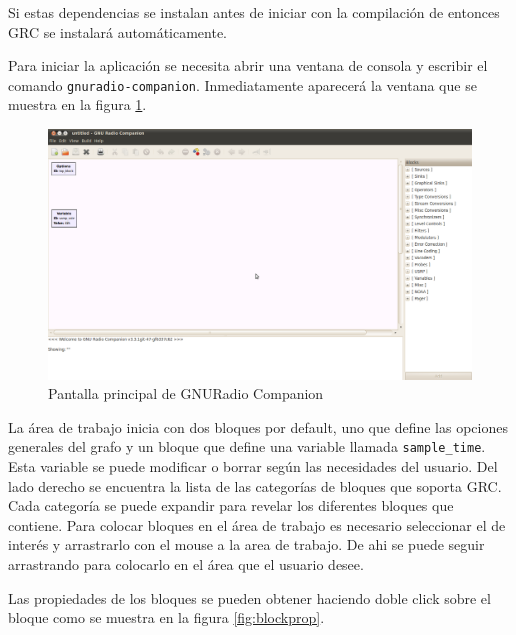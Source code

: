 Si estas dependencias se instalan antes de iniciar con la compilaci\'on de \gnuradio entonces GRC se
instalar\'a autom\'aticamente.

Para iniciar la aplicaci\'on se necesita abrir una ventana de consola y escribir el comando
\verb|gnuradio-companion|. Inmediatamente aparecer\'a la ventana que se muestra en la figura
\ref{fig:grc}.

\begin{figure}[tp]
  \centering
  \includegraphics[width=5.5in]{figs/grc1}
  \vspace{0.3in}
  \caption{Pantalla principal de GNURadio Companion}
  \label{fig:grc}
\end{figure}

La \'area de trabajo inicia con dos bloques por default, uno que define las opciones generales del
grafo y un bloque que define una variable llamada \verb|sample_time|. Esta variable se puede
modificar o borrar seg\'un las necesidades del usuario. Del lado derecho se encuentra la lista de las
categor\'ias de bloques que soporta GRC. Cada categor\'ia se puede expandir para revelar los
diferentes bloques que contiene. Para colocar bloques en el \'area de trabajo es necesario
seleccionar el de inter\'es y arrastrarlo con el mouse a la area de trabajo. De ahi se puede seguir
arrastrando para colocarlo en el \'area que el usuario desee. 

Las propiedades de los bloques se pueden obtener haciendo doble click sobre el bloque como se
muestra en la figura \ref{fig:blockprop}.

